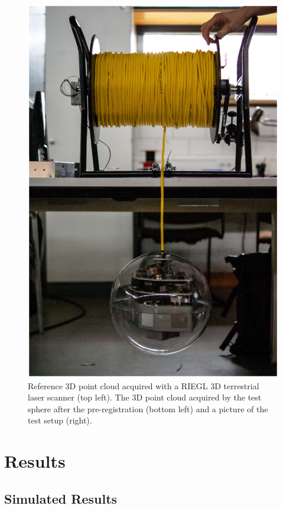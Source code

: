 \documentclass[5p]{elsarticle}
\begin{document}
\begin{figure}
\begin{minipage}[c]{0.2075\textwidth}
	  		\includegraphics[width=\textwidth]{./images/lidarsetup}
	  	\end{minipage}
		\caption{Reference 3D point cloud acquired with a RIEGL 3D terrestrial laser scanner (top left). The 3D point cloud acquired by the test sphere after the pre-registration (bottom left) and a picture of the test setup (right).}
		\label{fig:experimental-setup}
	\end{figure}
\fi



\section{Results}

\subsection{Simulated Results}
\end{document}
